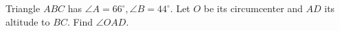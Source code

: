 Triangle $ABC$ has $\angle A=66^\circ,\angle B=44^\circ$. Let $O$ be its circumcenter and $AD$ its altitude to $BC$. Find $\angle OAD$.
